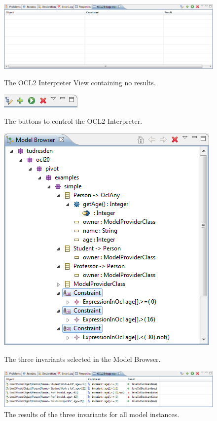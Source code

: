 \begin{figure}[!p]
	\centering
	\includegraphics[width=1.0\linewidth]{figures/interpreter/interpret01}
	\caption{The OCL2 Interpreter View containing no results.}
	\label{pic:interpret:interpret01}

  \vspace{2.0em}
  
	\centering
	\includegraphics[width=0.5\linewidth]{figures/interpreter/interpret02}
	\caption{The buttons to control the OCL2 Interpreter.}
	\label{pic:interpret:interpret02}
	
  \vspace{2.0em}

	\centering
	\includegraphics[width=0.6\linewidth]{figures/interpreter/interpret03}
	\caption{The three invariants selected in the Model Browser.}
	\label{pic:interpret:interpret03}

  \vspace{2.0em}

	\centering
	\includegraphics[width=1.0\linewidth]{figures/interpreter/interpret04}
	\caption{The results of the three invariants for all model instances.}
	\label{pic:interpret:interpret04}
\end{figure}


